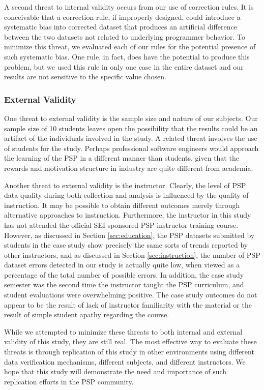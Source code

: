 A second threat to internal validity occurs from our use of correction
rules. It is conceivable that a correction rule, if improperly designed,
could introduce a systematic bias into corrected dataset that produces an
artificial difference between the two datasets not related to underlying
programmer behavior.  To minimize this threat, we evaluated each of our
rules for the potential presence of such systematic bias.  One rule, in
fact, does have the potential to produce this problem, but we used this
rule in only one case in the entire dataset and our results are not sensitive
to the specific value chosen.

\subsubsection{External Validity}

One threat to external validity is the sample size and nature of our
subjects. Our sample size of 10 students leaves open the possibility
that the results could be an artifact of the individuals involved
in the study.  A related threat involves the use of students for the
study. Perhaps professional software engineers would approach the 
learning of the PSP in a different manner than students, given that
the rewards and motivation structure in industry are quite different 
from academia.

Another threat to external validity is the instructor.  Clearly, the level
of PSP data quality during both collection and analysis is influenced by
the quality of instruction.  It may be possible to obtain different
outcomes merely through alternative approaches to instruction. Furthermore,
the instructor in this study has not attended the official SEI-sponsored PSP
instructor training course.  However, as discussed in Section
\ref{sec:education}, the PSP datasets submitted by students in the case
study show precisely the same sorts of trends reported by other
instructors, and as discussed in Section \ref{sec:instruction}, the number
of PSP dataset errors detected in our study is actually quite low, when
viewed as a percentage of the total number of possible errors.  In
addition, the case study semester was the second time the instructor taught
the PSP curriculum, and student evaluations were overwhelming positive. The
case study outcomes do not appear to be the result of lack of instructor
familiarity with the material or the result of simple student apathy
regarding the course.

While we attempted to minimize these threats to both internal and external
validity of this study, they are still real.  The most effective way to
evaluate these threats is through replication of this study in other
environments using different data verification mechanisms, different
subjects, and different instructors.  We hope that this study will
demonstrate the need and importance of such replication efforts in the PSP
community.




